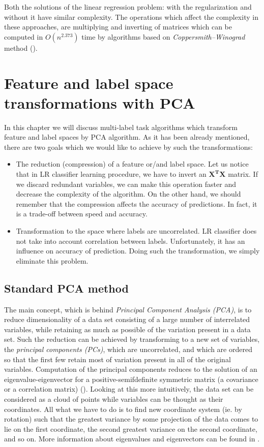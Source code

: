 Both the solutions of the linear regression problem: with the regularization and without it have similar complexity. The operations which affect the complexity in these approaches, are multiplying and inverting of matrices which can be computed in $O(n^{2.373})$ time by algorithms based on \textit{Coppersmith–Winograd} method (\cite{VVW}). 

\section{Feature and label space transformations with PCA}

In this chapter we will discuss multi-label task algorithms which transform feature and label spaces by PCA algorithm. As it has been already mentioned, there are two goals which we would like to achieve by such the transformations:
\begin{itemize}
    \item The reduction (compression) of a feature or/and label space. Let us notice that in LR classifier learning procedure, we have to invert an $\boldsymbol{X^T}\boldsymbol{X}$ matrix. If we discard redundant variables, we can make this operation faster and decrease the complexity of the algorithm. On the other hand, we should remember that the compression affects the accuracy of predictions. In fact, it is a trade-off between speed and accuracy.
    \item Transformation to the space where labels are uncorrelated. LR classifier does not take into account correlation between labels. Unfortunately, it has an influence on accuracy of prediction. Doing such the transformation, we simply eliminate this problem. 
\end{itemize}

\subsection{Standard PCA method}

The main concept, which is behind \textit{Principal Component Analysis (PCA)}, is to reduce dimensionality of a data set consisting of a large number of interrelated variables, while retaining as much as possible of the variation present in a data set. Such the reduction can be achieved by transforming to a new set of variables, the \textit{principal components (PCs)}, which are uncorrelated, and which are ordered so that the first few retain most of variation present in all of the original variables. Computation of the principal components reduces to the solution of an eigenvalue-eigenvector for a positive-semifdefinite symmetric matrix (a covariance or a correlation matrix) (\cite{Jolliffe}). Looking at this more intuitively, the data set can be considered as a cloud of points while variables can be thought as their coordinates. All what we have to do is to find new coordinate system (ie. by rotation) such that the greatest variance by some projection of the data comes to lie on the first coordinate, the second greatest variance on the second coordinate, and so on. More information about eigenvalues and eigenvectors can be found in . 

